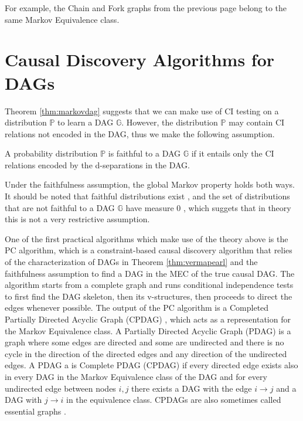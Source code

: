 \documentclass{tufte-book}
\begin{document}
For example, the Chain and Fork graphs from the previous page belong to the same Markov Equivalence class.

\section{Causal Discovery Algorithms for DAGs}
\label{sec:org16e6be6}

Theorem \ref{thm:markovdag} suggests that we can make use of CI testing on a distribution \(\mathbb{P}\) to learn a DAG \(\mathbb{G}\). However, the distribution \(\mathbb{P}\) may contain CI relations not encoded in the DAG, thus we make the following assumption.

\begin{definition}[Faithfulness]\label{def:faithfulness}

A probability distribution $\mathbb{P}$ is faithful to a DAG $\mathbb{G}$ if it entails only the CI relations encoded by the d-separations in the DAG.

\end{definition}

Under the faithfulness assumption, the global Markov property holds both ways. It should be noted that faithful distributions exist \cite{meek-1995-stron-compl}, and the set of distributions that are not faithful to a DAG \(\mathbb{G}\) have measure \(0\) \cite{uhler-2013-geomet-faith}, which suggets that in theory this is not a very restrictive assumption.



One of the first practical algorithms which make use of the theory above is the PC algorithm, \cite{spirtes-2000-causation-prediction-search,kalisch-2007-estim-high} which is a constraint-based causal discovery algorithm that relies of the characterization of DAGs in Theorem \ref{thm:vermapearl} and the faithfulness assumption to find a DAG in the MEC of the true causal DAG. The algorithm starts from a complete graph and runs conditional independence tests to first find the DAG skeleton, then its v-structures, then proceeds to direct the edges whenever possible. The output of the PC algorithm is a Completed Partially Directed Acyclic Graph (CPDAG) \cite{meek-1995-causal-infer}, which acts as a representation for the Markov Equivalence class. A Partially Directed Acyclic Graph (PDAG) is a graph where some edges are directed and some are undirected and there is no cycle in the direction of the directed edges and any direction of the undirected edges. A PDAG a is Complete PDAG (CPDAG) if every directed edge exists also in every DAG in the Markov Equivalence class of the DAG and for every undirected edge between nodes \(i,j\) there exists a DAG with the edge \(i \rightarrow j\) and a DAG with \(j \rightarrow i\) in the equivalence class. CPDAGs are also sometimes called essential graphs \cite{andersson-1997-charac-markov}.
\end{document}
